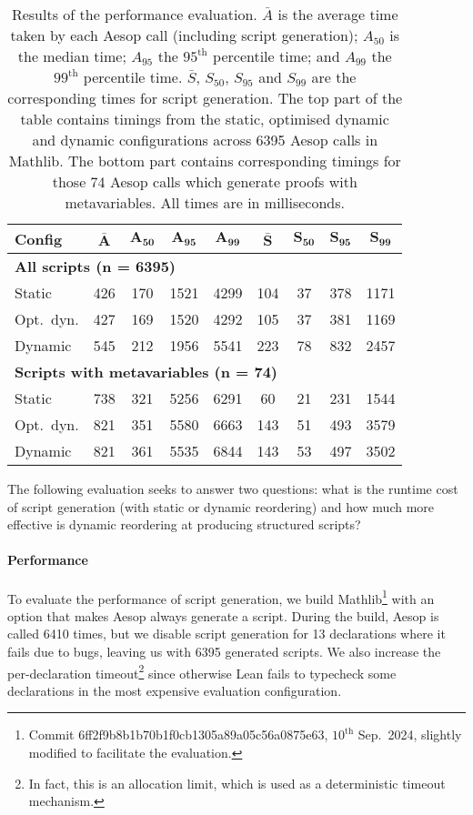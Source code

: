 \documentclass[sigplan,10pt,anonymous,review]{acmart}
\begin{document}
\begin{table}[ht]
  \centering
  \small
  \begin{tabular}{lcccc|cccc}
    \textbf{Config} & $\mathbf{\bar{A}}$ & $\mathbf{A_{50}}$ & $\mathbf{A_{95}}$ & $\mathbf{A_{99}}$ & $\mathbf{\bar{S}}$ & $\mathbf{S_{50}}$ & $\mathbf{S_{95}}$ & $\mathbf{S_{99}}$ \\
    \midrule
    \multicolumn{9}{l}{\textbf{All scripts (n = 6395)}} \\
    Static     & 426 & 170 & 1521 & 4299 & 104 & 37 & 378 & 1171 \\
    Opt.\ dyn. & 427 & 169 & 1520 & 4292 & 105 & 37 & 381 & 1169 \\
    Dynamic    & 545 & 212 & 1956 & 5541 & 223 & 78 & 832 & 2457 \\
    \midrule
    \multicolumn{9}{l}{\textbf{Scripts with metavariables (n = 74)}} \\
    Static     & 738 & 321 & 5256 & 6291 & 60  & 21 & 231 & 1544 \\
    Opt.\ dyn. & 821 & 351 & 5580 & 6663 & 143 & 51 & 493 & 3579 \\
    Dynamic    & 821 & 361 & 5535 & 6844 & 143 & 53 & 497 & 3502 \\
  \end{tabular}
  \medskip
  \caption{Results of the performance evaluation.
    $\bar{A}$ is the average time taken by each Aesop call (including script generation); $A_{50}$ is the median time; $A_{95}$ the $95^{\mathrm{th}}$ percentile time; and $A_{99}$ the $99^{\mathrm{th}}$ percentile time.
    $\bar{S}$, $S_{50}$, $S_{95}$ and $S_{99}$ are the corresponding times for script generation.
    The top part of the table contains timings from the static, optimised dynamic and dynamic configurations across 6395 Aesop calls in Mathlib.
    The bottom part contains corresponding timings for those 74 Aesop calls which generate proofs with metavariables.
    All times are in milliseconds.}%
  \label{table:evaluation}
\end{table}

The following evaluation seeks to answer two questions:
what is the runtime cost of script generation (with static or dynamic reordering) and how much more effective is dynamic reordering at producing structured scripts?

\paragraph{Performance}
To evaluate the performance of script generation, we build Mathlib\footnote{Commit 6ff2f9b8b1b70b1f0cb1305a89a05c56a0875e63, $10^{\mathrm{th}}$ Sep.\ 2024, slightly modified to facilitate the evaluation.} with an option that makes Aesop always generate a script.
During the build, Aesop is called 6410 times, but we disable script generation for 13 declarations where it fails due to bugs, leaving us with 6395 generated scripts.
We also increase the per-declaration timeout\footnote{In fact, this is an allocation limit, which is used as a deterministic timeout mechanism.} since otherwise Lean fails to typecheck some declarations in the most expensive evaluation configuration.
\end{document}

